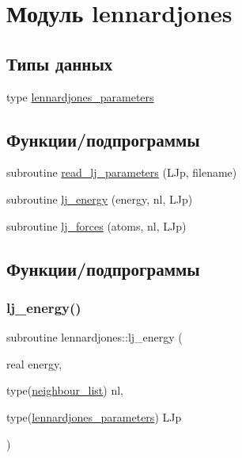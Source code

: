 \hypertarget{namespacelennardjones}{}\section{Модуль lennardjones}
\label{namespacelennardjones}
\subsection*{Типы данных}
\begin{DoxyCompactItemize}
\item 
type \mbox{\hyperlink{structlennardjones_1_1lennardjones__parameters}{lennardjones\+\_\+parameters}}
\end{DoxyCompactItemize}
\subsection*{Функции/подпрограммы}
\begin{DoxyCompactItemize}
\item 
subroutine \mbox{\hyperlink{namespacelennardjones_ace8630f2bebc2a2aac8ab12a64aedffa}{read\+\_\+lj\+\_\+parameters}} (L\+Jp, filename)
\item 
subroutine \mbox{\hyperlink{namespacelennardjones_af8b565355907ac9a41a6336acd884a37}{lj\+\_\+energy}} (energy, nl, L\+Jp)
\item 
subroutine \mbox{\hyperlink{namespacelennardjones_af88358c174f20878507192477e6b8dde}{lj\+\_\+forces}} (atoms, nl, L\+Jp)
\end{DoxyCompactItemize}


\subsection{Функции/подпрограммы}
\mbox{\label{namespacelennardjones_af8b565355907ac9a41a6336acd884a37}} 
\subsubsection{\texorpdfstring{lj\+\_\+energy()}{lj\_energy()}}
{\footnotesize\ttfamily subroutine lennardjones\+::lj\+\_\+energy (\begin{DoxyParamCaption}\item[{real}]{energy,  }\item[{type(\mbox{\hyperlink{structmd__general_1_1neighbour__list}{neighbour\+\_\+list}})}]{nl,  }\item[{type(\mbox{\hyperlink{structlennardjones_1_1lennardjones__parameters}{lennardjones\+\_\+parameters}})}]{L\+Jp }\end{DoxyParamCaption})}



